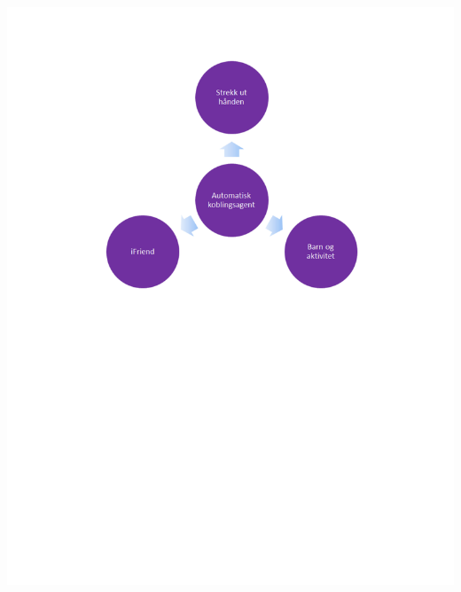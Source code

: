 \begin{center}
\includegraphics[clip=true, width=1 \textwidth,
trim=0cm 13cm 0cm 1cm]{automatiskKoblingsagent.pdf}
\label{fig:automatiskKoblingsagent}
\end{center}
